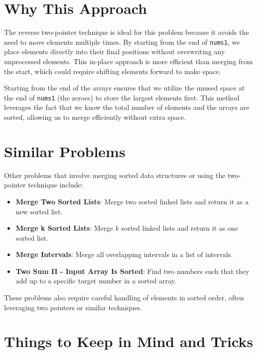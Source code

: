 \section*{Why This Approach}

The reverse two-pointer technique is ideal for this problem because it avoids the need to move elements multiple times. By starting from the end of \texttt{nums1}, we place elements directly into their final positions without overwriting any unprocessed elements. This in-place approach is more efficient than merging from the start, which could require shifting elements forward to make space.

Starting from the end of the arrays ensures that we utilize the unused space at the end of \texttt{nums1} (the zeroes) to store the largest elements first. This method leverages the fact that we know the total number of elements and the arrays are sorted, allowing us to merge efficiently without extra space.

\section*{Similar Problems}

Other problems that involve merging sorted data structures or using the two-pointer technique include:

\begin{itemize}
    \item \textbf{Merge Two Sorted Lists}: Merge two sorted linked lists and return it as a new sorted list.
    \item \textbf{Merge k Sorted Lists}: Merge $k$ sorted linked lists and return it as one sorted list.
    \item \textbf{Merge Intervals}: Merge all overlapping intervals in a list of intervals.
    \item \textbf{Two Sum II - Input Array Is Sorted}: Find two numbers such that they add up to a specific target number in a sorted array.
\end{itemize}

These problems also require careful handling of elements in sorted order, often leveraging two pointers or similar techniques.

\section*{Things to Keep in Mind and Tricks}

